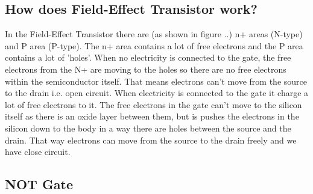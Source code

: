 \subsection{ How does Field-Effect Transistor work? }
In the Field-Effect Transistor there are (as shown in figure ..) n+ areas (N-type) and P area (P-type). The n+ area contains a lot of free electrons and the P area contains a lot of 'holes'. When no electricity is connected to the gate, the free electrons from the N+ are moving to the holes so there are no free electrons within the semiconductor itself. That means electrons can't move from the source to the drain i.e. open circuit. When electricity is connected to the gate it charge a lot of free electrons to it. The free electrons in the gate can't move to the silicon itself as there is an oxide layer between them, but is pushes the electrons in the silicon down to the body in a way there are holes between the source and the drain. That way electrons can move from the source to the drain freely and we have close circuit. 
\subsection{ NOT Gate }

